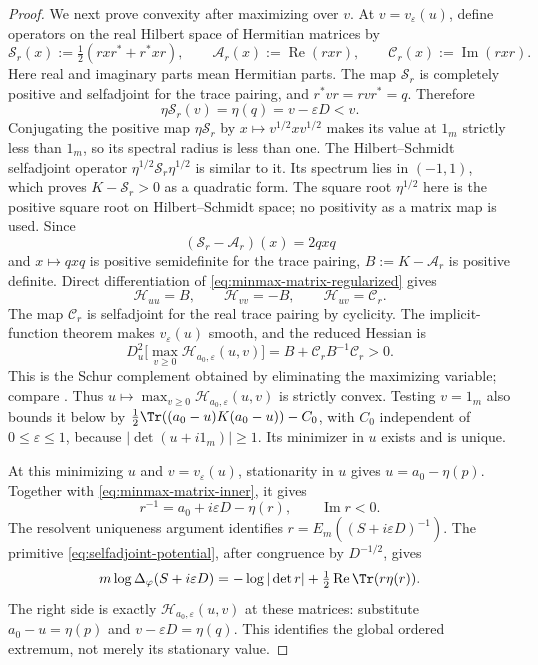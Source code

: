 \begin{proof}
We next prove convexity after maximizing over $v$.
At $v=v_\varepsilon(u)$, define operators on the real Hilbert space of Hermitian matrices by
\[
 \mathcal S_r(x):=\tfrac12(rxr^*+r^*xr),\qquad
 \mathcal A_r(x):=\operatorname{Re}(rxr),\qquad
 \mathcal C_r(x):=\operatorname{Im}(rxr).
\]
Here real and imaginary parts mean Hermitian parts.
The map $\mathcal S_r$ is completely positive and selfadjoint for the trace pairing, and $r^*vr=rvr^*=q$.
Therefore
\[
 \eta\mathcal S_r(v)=\eta(q)=v-\varepsilon D<v.
\]
Conjugating the positive map $\eta\mathcal S_r$ by $x\mapsto v^{1/2}xv^{1/2}$ makes its value at $1_m$ strictly less than $1_m$, so its spectral radius is less than one.
The Hilbert--Schmidt selfadjoint operator $\eta^{1/2}\mathcal S_r\eta^{1/2}$ is similar to it.
Its spectrum lies in $(-1,1)$, which proves $K-\mathcal S_r>0$ as a quadratic form.
The square root $\eta^{1/2}$ here is the positive square root on Hilbert--Schmidt space; no positivity as a matrix map is used.
Since
\[
 (\mathcal S_r-\mathcal A_r)(x)=2qxq
\]
and $x\mapsto qxq$ is positive semidefinite for the trace pairing, $B:=K-\mathcal A_r$ is positive definite.
Direct differentiation of \eqref{eq:minmax-matrix-regularized} gives
\[
 \mathcal H_{uu}=B,\qquad
 \mathcal H_{vv}=-B,\qquad
 \mathcal H_{uv}=\mathcal C_r.
\]
The map $\mathcal C_r$ is selfadjoint for the real trace pairing by cyclicity.
The implicit-function theorem makes $v_\varepsilon(u)$ smooth, and the reduced Hessian is
\begin{equation}\label{eq:minmax-matrix-hessian}
 D_u^2\bigl[\max_{v\ge0}\mathcal H_{a_0,\varepsilon}(u,v)\bigr]
       =B+\mathcal C_r B^{-1}\mathcal C_r>0.
\end{equation}
This is the Schur complement obtained by eliminating the maximizing variable; compare \cite[Appendix A.5.5]{BV04}.
Thus $u\mapsto\max_{v\ge0}\mathcal H_{a_0,\varepsilon}(u,v)$ is strictly convex.
Testing $v=1_m$ also bounds it below by $\frac12\Tr((a_0-u)K(a_0-u))-C_0$, with $C_0$ independent of $0\le\varepsilon\le1$, because $|\det(u+i1_m)|\ge1$.
Its minimizer in $u$ exists and is unique.

At this minimizing $u$ and $v=v_\varepsilon(u)$, stationarity in $u$ gives $u=a_0-\eta(p)$.
Together with \eqref{eq:minmax-matrix-inner}, it gives
\[
 r^{-1}=a_0+i\varepsilon D-\eta(r),
 \qquad \operatorname{Im}r<0.
\]
The resolvent uniqueness argument identifies $r=E_m((S+i\varepsilon D)^{-1})$.
The primitive \eqref{eq:selfadjoint-potential}, after congruence by $D^{-1/2}$, gives
\begin{equation}\label{eq:minmax-matrix-value}
 m\log\Delta_\varphi(S+i\varepsilon D)
 =-\log|\det r|
       +\tfrac12\operatorname{Re}\Tr(r\eta(r)).
\end{equation}
The right side is exactly $\mathcal H_{a_0,\varepsilon}(u,v)$ at these matrices: substitute $a_0-u=\eta(p)$ and $v-\varepsilon D=\eta(q)$.
This identifies the global ordered extremum, not merely its stationary value.


\end{proof}
